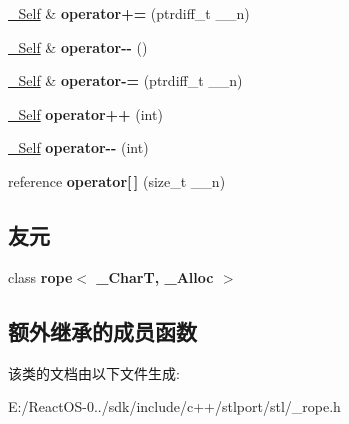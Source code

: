 \begin{DoxyCompactItemize}
\item 
\mbox{\label{class___rope__const__iterator_a02f26f0b1022401f2a570faf53faddbf}} 
\hyperlink{class___rope__iterator__base}{\+\_\+\+Self} \& {\bfseries operator+=} (ptrdiff\+\_\+t \+\_\+\+\_\+n)
\item 
\mbox{\label{class___rope__const__iterator_a37cea9a813f8cee33b1c435552eabed2}} 
\hyperlink{class___rope__iterator__base}{\+\_\+\+Self} \& {\bfseries operator-\/-\/} ()
\item 
\mbox{\label{class___rope__const__iterator_a41d2c567ab0ea6a1709f8deb9b094e01}} 
\hyperlink{class___rope__iterator__base}{\+\_\+\+Self} \& {\bfseries operator-\/=} (ptrdiff\+\_\+t \+\_\+\+\_\+n)
\item 
\mbox{\label{class___rope__const__iterator_a1113d5a23be128f8918503000454b6c8}} 
\hyperlink{class___rope__iterator__base}{\+\_\+\+Self} {\bfseries operator++} (int)
\item 
\mbox{\label{class___rope__const__iterator_a029415f955401d0689b953eaea569850}} 
\hyperlink{class___rope__iterator__base}{\+\_\+\+Self} {\bfseries operator-\/-\/} (int)
\item 
\mbox{\label{class___rope__const__iterator_a0435e937064a4620f6c3d572213566bb}} 
reference {\bfseries operator\mbox{[}$\,$\mbox{]}} (size\+\_\+t \+\_\+\+\_\+n)
\end{DoxyCompactItemize}
\subsection*{友元}
\begin{DoxyCompactItemize}
\item 
\mbox{\label{class___rope__const__iterator_a00faa722d619490e42c85e81ecdeba5e}} 
class {\bfseries rope$<$ \+\_\+\+Char\+T, \+\_\+\+Alloc $>$}
\end{DoxyCompactItemize}
\subsection*{额外继承的成员函数}


该类的文档由以下文件生成\+:\begin{DoxyCompactItemize}
\item 
E\+:/\+React\+O\+S-\/0../sdk/include/c++/stlport/stl/\+\_\+rope.\+h\end{DoxyCompactItemize}
